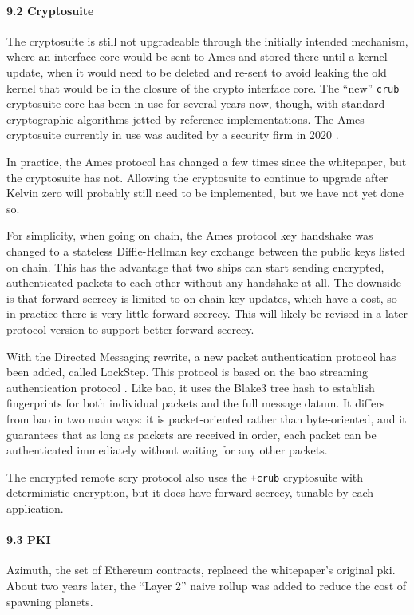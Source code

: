 \documentclass[twoside]{article}
\begin{document}
\paragraph{9.2 Cryptosuite}

The cryptosuite is still not upgradeable through the initially intended mechanism, where an interface core would be sent to Ames and stored there until a kernel update, when it would need to be deleted and re-sent to avoid leaking the old kernel that would be in the closure of the crypto interface core.  The ``new'' \lstinline[style=inlinecode]{crub} cryptosuite core has been in use for several years now, though, with standard cryptographic algorithms jetted by reference implementations.  The Ames cryptosuite currently in use was audited by a security firm in 2020 \citep{AmesAudit}.

In practice, the Ames protocol has changed a few times since the whitepaper, but the cryptosuite has not.  Allowing the cryptosuite to continue to upgrade after Kelvin zero will probably still need to be implemented, but we have not yet done so.

For simplicity, when going on chain, the Ames protocol key handshake was changed to a stateless Diffie-Hellman key exchange between the public keys listed on chain.  This has the advantage that two ships can start sending encrypted, authenticated packets to each other without any handshake at all.  The downside is that forward secrecy is limited to on-chain key updates, which have a cost, so in practice there is very little forward secrecy.  This will likely be revised in a later protocol version to support better forward secrecy.

With the Directed Messaging rewrite, a new packet authentication protocol has been added, called LockStep.  This protocol is based on the {\sc bao} streaming authentication protocol \citep{BAO}.  Like {\sc bao}, it uses the Blake3 tree hash to establish fingerprints for both individual packets and the full message datum.  It differs from {\sc bao} in two main ways: it is packet-oriented rather than byte-oriented, and it guarantees that as long as packets are received in order, each packet can be authenticated immediately without waiting for any other packets.

The encrypted remote scry protocol also uses the \lstinline[style=inlinecode]{+crub} cryptosuite with deterministic encryption, but it does have forward secrecy, tunable by each application.

\paragraph{9.3 PKI}  Azimuth, the set of Ethereum contracts, replaced the whitepaper's original {\sc pki}.  About two years later, the ``Layer 2'' naive rollup was added to reduce the cost of spawning planets.
\end{document}
